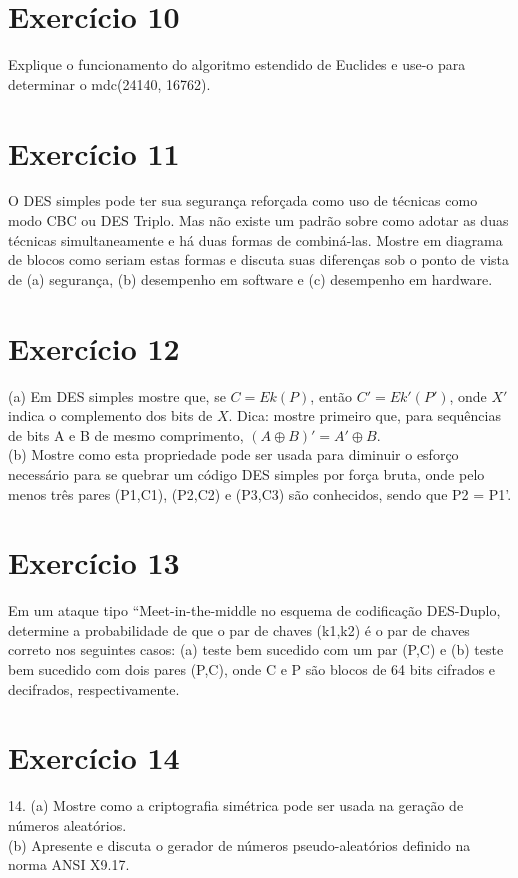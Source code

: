\documentclass[10pt,a4paper]{article}
\begin{document}
\section*{Exercício 10}
Explique o funcionamento do algoritmo estendido de Euclides e use-o para determinar o mdc(24140, 16762).
\section*{Exercício 11}
O DES simples pode ter sua segurança reforçada como uso de técnicas como modo CBC ou DES Triplo. Mas não existe um padrão sobre como adotar as duas técnicas simultaneamente e há duas formas de combiná-las. Mostre em diagrama de blocos como seriam estas formas e discuta suas diferenças sob o ponto de vista de (a) segurança, (b) desempenho em software e (c) desempenho em hardware.\\
\section*{Exercício 12}
(a) Em DES simples mostre que, se $C=Ek(P)$, então $C'=Ek'(P')$, onde $X'$ indica o complemento dos bits de $X$. Dica: mostre primeiro que, para sequências de bits A e B de mesmo comprimento, $(A \oplus B)' = A' \oplus B$.\\
(b) Mostre como esta propriedade pode ser usada para diminuir o esforço necessário para se quebrar um código DES simples por força bruta, onde pelo menos três pares (P1,C1), (P2,C2) e (P3,C3) são conhecidos, sendo que P2 = P1'.\\
\section*{Exercício 13}
Em um ataque tipo ``Meet-in-the-middle no esquema de codificação DES-Duplo, determine a probabilidade de que o par de chaves (k1,k2) é o par de chaves correto nos seguintes casos: (a) teste bem sucedido com um par (P,C) e (b) teste bem sucedido com dois pares (P,C), onde C e P são blocos de 64 bits cifrados e decifrados, respectivamente.\\
\section*{Exercício 14}
14. (a) Mostre como a criptografia simétrica pode ser usada na geração de números aleatórios.\\
(b) Apresente e discuta o gerador de números pseudo-aleatórios definido na norma ANSI X9.17.\\
\end{document}
